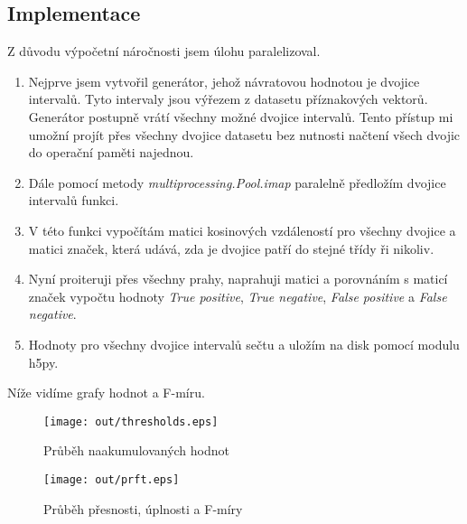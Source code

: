 \documentclass[11pt]{article}
\begin{document}
    \subsection{Implementace}\label{subsec:implementaceprahovani}
    Z důvodu výpočetní náročnosti jsem úlohu paralelizoval.

    \begin{enumerate}
        \item Nejprve jsem vytvořil generátor, jehož návratovou hodnotou je dvojice intervalů.
        Tyto intervaly jsou výřezem z datasetu příznakových vektorů.
        Generátor postupně vrátí všechny možné dvojice intervalů.
        Tento přístup mi umožní projít přes všechny dvojice datasetu bez nutnosti načtení všech dvojic do operační
        paměti najednou.
        \item Dále pomocí metody \textit{multiprocessing.Pool.imap} paralelně předložím dvojice intervalů funkci.
        \item V této funkci vypočítám matici kosinových vzdáleností pro všechny dvojice a matici značek, která udává,
        zda je dvojice patří do stejné třídy ři nikoliv.
        \item Nyní proiteruji přes všechny prahy, naprahuji matici a porovnáním s maticí značek vypočtu hodnoty
        \textit{True positive}, \textit{True negative}, \textit{False positive} a \textit{False negative}.
        \item Hodnoty pro všechny dvojice intervalů sečtu a uložím na disk pomocí modulu h5py.
    \end{enumerate}

    Níže vidíme grafy hodnot a F-míru.

    \begin{figure}[H]
        \centering
        \texttt{[image: out/thresholds.eps]}
        \caption{Průběh naakumulovaných hodnot}
        \label{fig:thresh}
    \end{figure}

    \newpage

    \begin{figure}[H]
        \centering
        \texttt{[image: out/prft.eps]}
        \caption{Průběh přesnosti, úplnosti a F-míry}
        \label{fig:prft}
    \end{figure}
\end{document}
